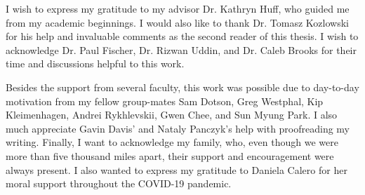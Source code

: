 
I wish to express my gratitude to my advisor Dr. Kathryn Huff, who guided me from my academic beginnings.
I would also like to thank Dr. Tomasz Kozlowski for his help and invaluable comments as the second reader of this thesis.
I wish to acknowledge Dr. Paul Fischer, Dr. Rizwan Uddin, and Dr. Caleb Brooks for their time and discussions helpful to this work.

Besides the support from several faculty, this work was possible due to day-to-day motivation from my fellow group-mates Sam Dotson, Greg Westphal, Kip Kleimenhagen, Andrei Rykhlevskii, Gwen Chee, and Sun Myung Park.
I also much appreciate Gavin Davis' and Nataly Panczyk's help with proofreading my writing.
Finally, I want to acknowledge my family, who, even though we were more than five thousand miles apart, their support and encouragement were always present.
I also wanted to express my gratitude to Daniela Calero for her moral support throughout the COVID-19 pandemic.
